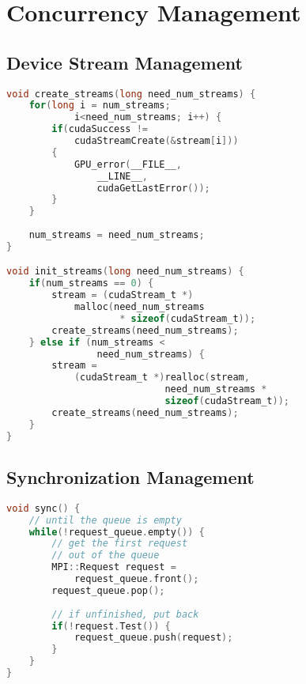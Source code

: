 \chapter{Concurrency Management} \label{chap:ConcurrencyManagement}
\section{Device Stream Management} \label{sec:DeviceStreamManagement}
\begin{lstlisting}[language=C,caption={Device Stream Management}]
void create_streams(long need_num_streams) {
	for(long i = num_streams; 
	        i<need_num_streams; i++) {
		if(cudaSuccess != 
		    cudaStreamCreate(&stream[i])) 
		{ 
		    GPU_error(__FILE__, 
		        __LINE__, 
		        cudaGetLastError());
		}
	}
	
	num_streams = need_num_streams;
}

void init_streams(long need_num_streams) {
	if(num_streams == 0) {
		stream = (cudaStream_t *)
		    malloc(need_num_streams 
		            * sizeof(cudaStream_t));
		create_streams(need_num_streams);
	} else if (num_streams < 
	            need_num_streams) {
		stream = 
		    (cudaStream_t *)realloc(stream, 
		                    need_num_streams * 
		                    sizeof(cudaStream_t));	
		create_streams(need_num_streams);
	}
}
\end{lstlisting}

\section{Synchronization Management} \label{sec:SynchronizationManagement}
\begin{lstlisting}[language=C,caption={Synchronization Management}]
void sync() {
    // until the queue is empty
	while(!request_queue.empty()) {
	    // get the first request 
	    // out of the queue
		MPI::Request request = 
		    request_queue.front();
		request_queue.pop();
		
		// if unfinished, put back
		if(!request.Test()) {
			request_queue.push(request);
		}
	}
}
\end{lstlisting}